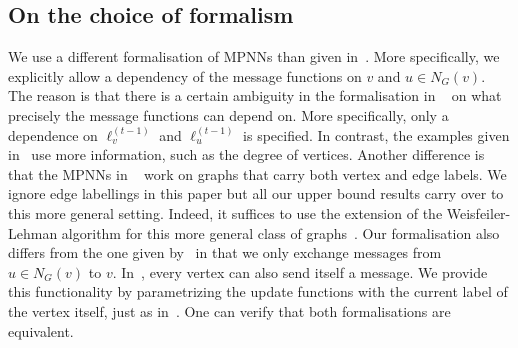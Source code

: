 \subsection{On the choice of formalism}
We use a different formalisation of MPNNs than given in~\cite{GilmerSRVD17}. More specifically, we explicitly allow a dependency of the message functions on $v$ and $u\in N_G(v)$. The reason is that there is a certain ambiguity in the formalisation in ~\cite{GilmerSRVD17} on what precisely the message functions can depend on. More specifically, only a dependence on  $\pmb{\ell}_v^{(t-1)}$ and $\pmb{\ell}_u^{(t-1)}$
is specified. In contrast, the examples given in~\cite{GilmerSRVD17} use more information, such as the degree of vertices. Another difference is that the MPNNs in ~\cite{GilmerSRVD17} work on graphs that carry both vertex and edge labels. We ignore edge labellings in this paper but all our upper bound results carry over to this more general setting. Indeed, it suffices to use the extension of the Weisfeiler-Lehman algorithm for this more general class of graphs~\cite{Jaume2019}. Our formalisation also differs from the one given by~\cite{Loukas2019} in that we only exchange messages from $u\in N_G(v)$
to $v$. In~\cite{Loukas2019}, every vertex can also send itself a message. We provide this functionality by parametrizing the update functions with the current label of the vertex itself, just as in~\cite{GilmerSRVD17}. One can verify that both formalisations are equivalent.
